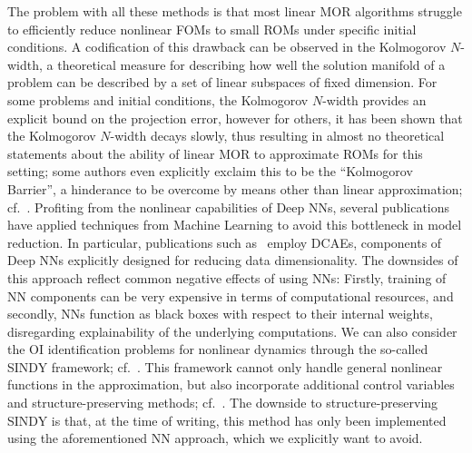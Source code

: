 The problem with all these methods is that most linear MOR algorithms struggle to efficiently reduce nonlinear \acp{FOM} to small \acp{ROM} under specific initial conditions.
A codification of this drawback can be observed in the Kolmogorov $N$-width, a theoretical measure for describing how well the solution manifold of a problem can be described by a set of linear subspaces of fixed dimension.
For some problems and initial conditions, the Kolmogorov $N$-width provides an explicit bound on the projection error, however for others, it has been shown that the Kolmogorov $N$-width decays slowly, thus resulting in almost no theoretical statements about the ability of linear \ac{MOR} to approximate \acp{ROM} for this setting; some authors even explicitly exclaim this to be the ``Kolmogorov Barrier'', a hinderance to be overcome by means other than linear approximation; cf.~\cite{Barnett2022}.
Profiting from the nonlinear capabilities of Deep \acfp{NN}, several publications have applied techniques from Machine Learning to avoid this bottleneck in model reduction.
In particular, publications such as~\cite{Lee2020, Benner2022, Romor2023, Buchfink2023} employ \acp{DCAE}, components of Deep \acp{NN} explicitly designed for reducing data dimensionality.
The downsides of this approach reflect common negative effects of using \acp{NN}: Firstly, training of \ac{NN} components can be very expensive in terms of computational resources, and secondly, \acp{NN} function as black boxes with respect to their internal weights, disregarding explainability of the underlying computations.
We can also consider the \ac{OI} identification problems for nonlinear dynamics through the so-called \acs{SINDY} framework; cf.~\cite{Brunton2016, Kaheman2020}.
This framework cannot only handle general nonlinear functions in the approximation, but also incorporate additional control variables and structure-preserving methods; cf.~\cite{Kaiser2018, Lee2022}.
The downside to structure-preserving \acs{SINDY} is that, at the time of writing, this method has only been implemented using the aforementioned \ac{NN} approach, which we explicitly want to avoid.


